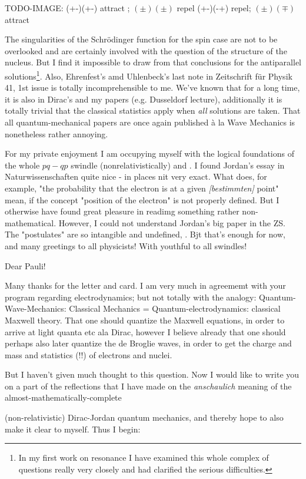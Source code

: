 \documentclass{article}
\begin{document}
{TODO-IMAGE:
(+-)(+-) attract ; $(\pm)(\pm)$ repel
(+-)(-+) repel; $(\pm)(\mp)$ attract

The singularities of the Schr\"odinger function for the spin case are not to be overlooked and are certainly involved with the question of the structure of the nucleus. But I find it impossible to draw from that conclusions for the antiparallel solutions\footnote{In my first work on resonance I have examined this whole complex of questions really very closely and had clarified the serious difficulties.}. Also, Ehrenfest's amd Uhlenbeck's last note in Zeitschrift f\"ur Physik 41, 1st issue is totally incomprehensible to me. We've known that for a long time, it is also in Dirac's and my papers (e.g. Dusseldorf lecture), additionally it is totally trivial that the classical statistics apply when \textit{all} solutions are taken. That all quantum-mechanical papers are once again published \`a la Wave Mechanics is nonetheless rather annoying.

For my private enjoyment I am occupying myself with the logical foundations of the whole $pq-qp$ swindle (nonrelativistically) and . I found Jordan's essay in Naturwissenschaften quite nice - in places nit very exact. What does, for example, "the probability that the electron is at a given \textit{[bestimmten]} point" mean, if the concept "position of the electron" is not properly defined. But I otherwise have found great pleasure in readimg something rather non-mathematical. However, I could not understand Jordan's big paper in the ZS. The "postulates" are so intangible and undefined, . Bjt that's enough for now, and many greetings to all physicists! With youthful  to all  swindles!

\date{February 23, 1927}

Dear Pauli!

Many thanks for the letter and card. I am very much in agreememt with your program regarding electrodynamics; but not totally with the analogy: Quantum-Wave-Mechanics: Classical Mechanics = Quantum-electrodynamics: classical Maxwell theory. That one should quantize the Maxwell equations, in order to arrive at light quanta etc ala Dirac, however I believe already that one should perhaps also later quantize the de Broglie waves, in order to get the charge and mass and statistics (!!) of electrons and nuclei.

But I haven't given much thought to this question. Now I would like to write you on a part of the reflections that I have made on the \textit{anschaulich} meaning of the \?almost-mathematically-complete} (non-relativistic) Dirac-Jordan quantum mechanics, and thereby hope to also make it clear to myself. Thus I begin:
\end{document}
